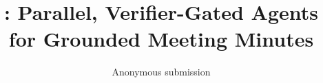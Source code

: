 \documentclass[11pt]{article}
\title{\method: Parallel, Verifier-Gated Agents for Grounded Meeting Minutes}
\author{Anonymous submission}
\begin{document}
\maketitle

\begin{abstract}
\end{abstract}








\appendix

\end{document}
